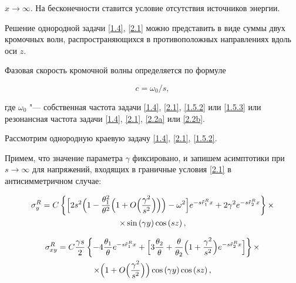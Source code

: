 $x\rightarrow\infty$. На бесконечности ставится условие отсутствия источников энергии.



Решение однородной задачи \eqref{1.4}, \eqref{2.1} можно представить в виде суммы двух кромочных волн, распространяющихся в противоположных направлениях вдоль оси $z$. 

Фазовая скорость кромочной волны определяется по формуле

\begin{equation}

\label{2.4}

c = {\omega_0}/{s},

\end{equation}

где $\omega_0$ "--- собственная частота задачи \eqref{1.4}, \eqref{2.1}, \eqref{1.5.2} или \eqref{1.5.3} или резонансная частота задачи \eqref{1.4}, \eqref{2.1}, \eqref{2.2a} или \eqref{2.2b}.



Рассмотрим однородную краевую задачу \eqref{1.4}, \eqref{2.1}, \eqref{1.5.2}. 

Примем, что значение параметра $\gamma$ фиксировано, и запишем асимптотики при $s\to\infty$ для напряжений, входящих в граничные условия \eqref{2.1} в антисимметричном случае:

\begin{multline}

\sigma _{y}^{R} = \displaystyle C\left\{ \Bigl[ 2s^{2}

\Bigl( 1-\frac {\theta _{1}^{2}} {\theta ^{2}}\Bigl( 1+O\Bigl( \frac {\gamma^{2}} {s^{2}}\Bigr) \Bigr) \Bigr) -\omega ^{2}\Bigr] e^{-s\tilde{r}_1^R x} +2\gamma ^{2} e^{-s\tilde{r}_2^R x} \right\} \times \\ 

\times \sin \left( \gamma y\right) \cos \left( sz\right)  ,

\end{multline}

\begin{multline} 

 \label{2.5}

\sigma _{xy}^{R} = \displaystyle C \frac{\gamma s}{2} \left\{ -4 \frac {\theta _{1}} {\theta } e^{-s\tilde{r}_1^R x} +

\Bigl[ 3 \frac {\theta _{2}} {\theta }+\frac {\theta } {\theta _{2}}\Bigl( 1+\frac {\gamma ^{2}} {s^2}\Bigr) e^{-s\tilde{r}_2^R x} \Bigr] \right\}  \times \\

\times \Bigl( 1+O\Bigl( \frac {\gamma^{2}} {s^{2}}\Bigr) \Bigr) \cos \left( \gamma y\right) \cos \left( sz\right) , \end{multline}

